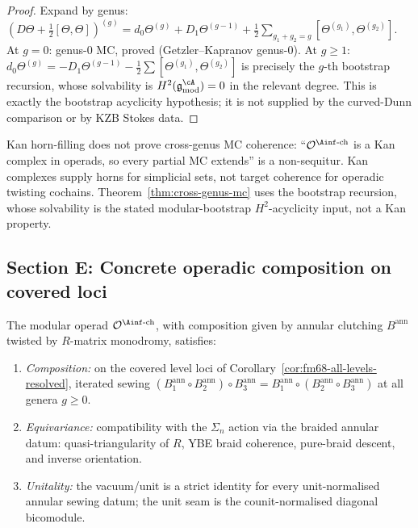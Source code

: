 \begin{proof}
Expand by genus:
$(D\Theta + \tfrac{1}{2}[\Theta,\Theta])^{(g)}
= d_0 \Theta^{(g)} + D_1 \Theta^{(g-1)}
+ \tfrac{1}{2}\sum_{g_1+g_2=g}[\Theta^{(g_1)}, \Theta^{(g_2)}]$.
At $g=0$: genus-$0$ MC, proved (Getzler--Kapranov genus-$0$).
At $g \ge 1$: $d_0\Theta^{(g)} = -D_1\Theta^{(g-1)}
- \tfrac{1}{2}\sum[\Theta^{(g_1)},\Theta^{(g_2)}]$ is precisely the
$g$-th bootstrap recursion, whose solvability is
$H^2(\mathfrak{g}^{\cA}_{\mathrm{mod}}) = 0$ in the relevant
degree. This is exactly the bootstrap acyclicity hypothesis; it is
not supplied by the curved-Dunn comparison or by KZB Stokes data.
\end{proof}

\begin{remark}
\label{rem:kan-replacement}
Kan horn-filling does not prove cross-genus MC coherence:
``$\mathcal{O}^{\Ainf\text{-ch}}$ is a Kan complex in operads, so
every partial MC extends'' is a non-sequitur. Kan complexes supply
horns for simplicial sets, not target coherence for operadic twisting
cochains. Theorem~\ref{thm:cross-genus-mc} uses the bootstrap
recursion, whose solvability is the stated modular-bootstrap
\(H^2\)-acyclicity input, not a Kan property.
\end{remark}

\subsection{Section E: Concrete operadic composition on covered loci}
\label{subsec:concrete-composition}

\begin{theorem}
\label{thm:concrete-operadic-composition}
The modular operad $\mathcal{O}^{\Ainf\text{-ch}}$, with
composition given by annular clutching $B^{\mathrm{ann}}$ twisted
by $R$-matrix monodromy, satisfies:
\begin{enumerate}[label=\textup{(\roman*)}]
\item \emph{Composition:} on the covered level loci of
Corollary~\ref{cor:fm68-all-levels-resolved}, iterated sewing
 $(B^{\mathrm{ann}}_1 \circ B^{\mathrm{ann}}_2) \circ
 B^{\mathrm{ann}}_3 = B^{\mathrm{ann}}_1 \circ
 (B^{\mathrm{ann}}_2 \circ B^{\mathrm{ann}}_3)$ at all genera
 $g \ge 0$.
\item \emph{Equivariance:} compatibility with the $\Sigma_n$ action
 via the braided annular datum: quasi-triangularity of $R$, YBE
 braid coherence, pure-braid descent, and inverse orientation.
\item \emph{Unitality:} the vacuum/unit is a strict identity for every
 unit-normalised annular sewing datum; the unit seam is the
 counit-normalised diagonal bicomodule.
\end{enumerate}
\end{theorem}

